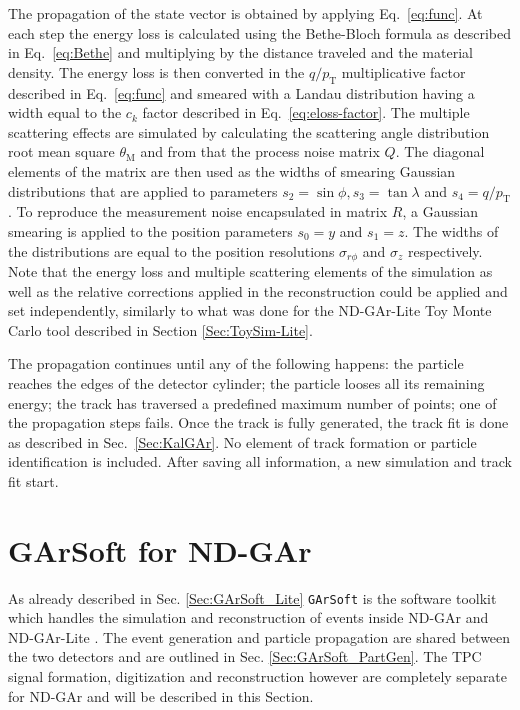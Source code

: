 The propagation of the state vector is obtained by applying Eq.~\ref{eq:func}. At each step the energy loss is calculated using the Bethe-Bloch formula as described in Eq.~\ref{eq:Bethe} and multiplying by the distance traveled and the material density. The energy loss is then converted in the $q/{p_{\text{T}}}$ multiplicative factor described in Eq.~\ref{eq:func} and smeared with a Landau distribution having a width equal to the $c_k$ factor described in Eq.~\ref{eq:eloss-factor}. The multiple scattering effects are simulated by calculating the scattering angle distribution root mean square $\theta_{\textrm{M}}$ and from that the process noise matrix $Q$. The diagonal elements of the matrix are then used as the widths of smearing Gaussian distributions that are applied to parameters $s_2=\sin\phi,s_3=\tan\lambda$ and $s_4=q/p_{\text{T}}$. To reproduce the measurement noise encapsulated in matrix $R$, a Gaussian smearing is applied to the position parameters $s_0=y$ and $s_1=z$. The widths of the distributions are equal to the position resolutions $\sigma_{r\phi}$ and $\sigma_{z}$ respectively. Note that the energy loss and multiple scattering elements of the simulation as well as the relative corrections applied in the reconstruction could be applied and set independently, similarly to what was done for the ND-GAr-Lite Toy Monte Carlo tool described in Section \ref{Sec:ToySim-Lite}.

The propagation continues until any of the following happens: the particle reaches the edges of the detector cylinder; the particle looses all its remaining energy; the track has traversed a predefined maximum number of points; one of the propagation steps fails.  Once the track is fully generated, the track fit is done as described in Sec.~\ref{Sec:KalGAr}. No element of track formation or particle identification is included. After saving all information, a new simulation and track fit start.

\section{GArSoft for ND-GAr}
\label{Sec:GArSoft-GAr}
As already described in Sec. \ref{Sec:GArSoft_Lite} \texttt{GArSoft} is the software toolkit which handles the simulation and reconstruction of events inside ND-GAr and ND-GAr-Lite \cite{garsoft}. The event generation and particle propagation are shared between the two detectors and are outlined in Sec. \ref{Sec:GArSoft_PartGen}. The TPC signal formation, digitization and reconstruction however are completely separate for ND-GAr and will be described in this Section.
